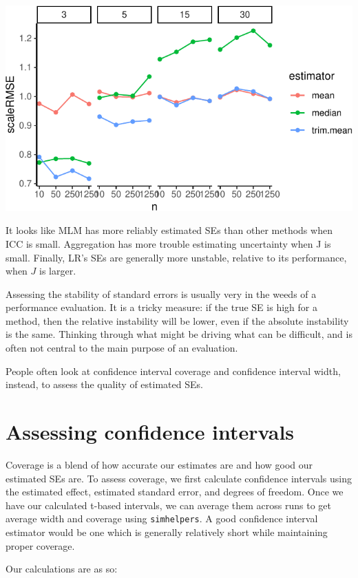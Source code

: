\documentclass[
]{book}
\begin{document}
\begin{center}\includegraphics[width=0.75\linewidth]{Designing-Simulations-in-R_files/figure-latex/unnamed-chunk-187-1} \end{center}

It looks like MLM has more reliably estimated SEs than other methods when ICC is small.
Aggregation has more trouble estimating uncertainty when J is small.
Finally, LR's SEs are generally more unstable, relative to its performance, when \(J\) is larger.

Assessing the stability of standard errors is usually very in the weeds of a performance evaluation.
It is a tricky measure: if the true SE is high for a method, then the relative instability will be lower, even if the absolute instability is the same.
Thinking through what might be driving what can be difficult, and is often not central to the main purpose of an evaluation.

People often look at confidence interval coverage and confidence interval width, instead, to assess the quality of estimated SEs.

\section{Assessing confidence intervals}\label{assessing-confidence-intervals-1}

Coverage is a blend of how accurate our estimates are and how good our estimated SEs are.
To assess coverage, we first calculate confidence intervals using the estimated effect, estimated standard error, and degrees of freedom.
Once we have our calculated t-based intervals, we can average them across runs to get average width and coverage using \texttt{simhelpers}.
A good confidence interval estimator would be one which is generally relatively short while maintaining proper coverage.

Our calculations are as so:
\end{document}
